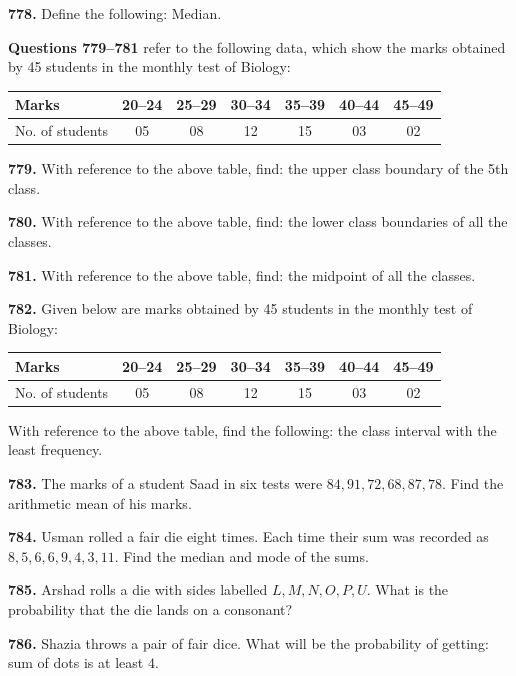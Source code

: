 \documentclass[11pt]{article}
\begin{document}
\bigskip
\noindent\textbf{778.} Define the following: Median.


\bigskip
\noindent\textbf{Questions 779--781} refer to the following data, which show the marks obtained by 45 students in the monthly test of Biology:

\begin{center}
\begin{tabular}{lcccccc}
\toprule
Marks & 20--24 & 25--29 & 30--34 & 35--39 & 40--44 & 45--49 \\
\midrule
No. of students & 05 & 08 & 12 & 15 & 03 & 02 \\
\bottomrule
\end{tabular}
\end{center}

\bigskip
\noindent\textbf{779.} With reference to the above table, find: the upper class boundary of the 5th class.

\bigskip
\noindent\textbf{780.} With reference to the above table, find: the lower class boundaries of all the classes.

\bigskip
\noindent\textbf{781.} With reference to the above table, find: the midpoint of all the classes.

\bigskip
\noindent\textbf{782.} Given below are marks obtained by 45 students in the monthly test of Biology:
\begin{center}
\begin{tabular}{lcccccc}
\toprule
Marks & 20--24 & 25--29 & 30--34 & 35--39 & 40--44 & 45--49 \\
\midrule
No. of students & 05 & 08 & 12 & 15 & 03 & 02 \\
\bottomrule
\end{tabular}
\end{center}
With reference to the above table, find the following: the class interval with the least frequency.

\bigskip
\noindent\textbf{783.} The marks of a student Saad in six tests were $84, 91, 72, 68, 87, 78$. Find the arithmetic mean of his marks.

\bigskip
\noindent\textbf{784.} Usman rolled a fair die eight times. Each time their sum was recorded as $8,5,6,6,9,4,3,11$. Find the median and mode of the sums.

\bigskip
\noindent\textbf{785.} Arshad rolls a die with sides labelled $L,M,N,O,P,U$. What is the probability that the die lands on a consonant?

\bigskip
\noindent\textbf{786.} Shazia throws a pair of fair dice. What will be the probability of getting: sum of dots is at least $4$.
\end{document}
